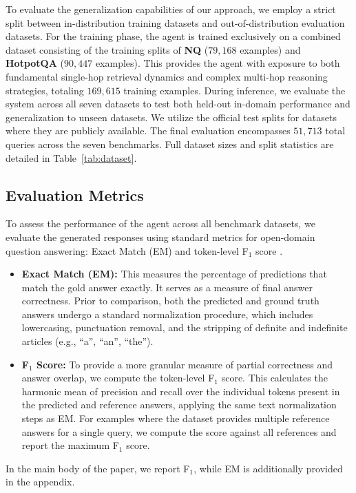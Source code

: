 \documentclass{article} %
\begin{document}
To evaluate the generalization capabilities of our approach, we employ a strict split between in-distribution training datasets and out-of-distribution evaluation datasets.  For the training phase, the agent is trained exclusively on a combined dataset consisting of the training splits of \textbf{NQ} ($79,168$ examples) and \textbf{HotpotQA} ($90,447$ examples). This provides the agent with exposure to both fundamental single-hop retrieval dynamics and complex multi-hop reasoning strategies, totaling $169,615$ training examples. During inference, we evaluate the system across all seven datasets to test both held-out in-domain performance and generalization to unseen datasets. We utilize the official test splits for datasets where they are publicly available. The final evaluation encompasses $51,713$ total queries across the seven benchmarks. Full dataset sizes and split statistics are detailed in Table~\ref{tab:dataset}.



\subsection{Evaluation Metrics}
\label{sec:eval-metrics}

To assess the performance of the agent across all benchmark datasets, we evaluate the generated responses using standard metrics for open-domain question answering: Exact Match (EM) and token-level F$_1$ score \citep{rajpurkar-etal-2016-squad}. 

\begin{itemize}[leftmargin=1.2em]
    
    \item \textbf{Exact Match (EM):} This measures the percentage of predictions that match the gold answer exactly. It serves as a measure of final answer correctness. Prior to comparison, both the predicted and ground truth answers undergo a standard normalization procedure, which includes lowercasing, punctuation removal, and the stripping of definite and indefinite articles (e.g., ``a'', ``an'', ``the''). 
    
    \item \textbf{F$_1$ Score:} To provide a more granular measure of partial correctness and answer overlap, we compute the token-level F$_1$ score. This calculates the harmonic mean of precision and recall over the individual tokens present in the predicted and reference answers, applying the same text normalization steps as EM. For examples where the dataset provides multiple reference answers for a single query, we compute the score against all references and report the maximum F$_1$ score.
\end{itemize}
In the main body of the paper, we report F$_1$, while EM  is additionally provided in the appendix.
\end{document}
